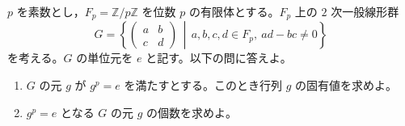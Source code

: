\documentclass[12pt]{jlreq}
\begin{document}
$p$ を素数とし，$F_p = \mathbb{Z}/p\mathbb{Z}$ を位数 $p$ の有限体とする。$F_p$ 上の $2$ 次一般線形群
\[
  G = \left\{ \begin{pmatrix} a & b \\ c & d \end{pmatrix} \,\middle|\, a, b, c, d \in F_p,\ ad - bc \ne 0 \right\}
\]
を考える。$G$ の単位元を $e$ と記す。以下の問に答えよ。

\begin{enumerate}
  \item $G$ の元 $g$ が $g^p = e$ を満たすとする。このとき行列 $g$ の固有値を求めよ。
  \item $g^p = e$ となる $G$ の元 $g$ の個数を求めよ。
\end{enumerate}
\end{document}
